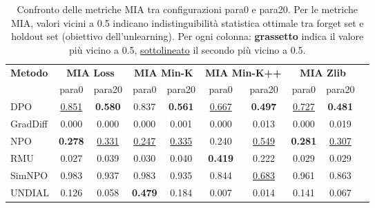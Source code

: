 \begin{table}[H]
\centering
\small
\begin{tabular}{lccccccccc}
\toprule
\textbf{Metodo} & \multicolumn{2}{c}{\textbf{MIA Loss}} & \multicolumn{2}{c}{\textbf{MIA Min-K} } & \multicolumn{2}{c}{\textbf{MIA Min-K++} } & \multicolumn{2}{c}{\textbf{MIA Zlib} } \\
\cmidrule(lr){2-3} \cmidrule(lr){4-5} \cmidrule(lr){6-7} \cmidrule(lr){8-9}
                & para0 & para20 & para0 & para20 & para0 & para20 & para0 & para20 \\
\midrule
DPO      & \underline{0.851} & \textbf{0.580} & 0.837 & \textbf{0.561} & \underline{0.667} & \textbf{0.497} & \underline{0.727} & \textbf{0.481} \\
GradDiff & 0.000 & 0.000 & 0.000 & 0.001 & 0.000 & 0.013 & 0.000 & 0.019 \\
NPO      & \textbf{0.278} & \underline{0.331} & \underline{0.247} & \underline{0.335} & 0.240 & \underline{0.549} & \textbf{0.281} & \underline{0.307} \\
RMU      & 0.027 & 0.039 & 0.030 & 0.040 & \textbf{0.419} & 0.222 & 0.029 & 0.029 \\
SimNPO   & 0.983 & 0.937 & 0.983 & 0.935 & 0.844 & \underline{0.683} & 0.961 & 0.863 \\
UNDIAL   & 0.126 & 0.058 & \textbf{0.479} & 0.184 & 0.007 & 0.014 & 0.141 & 0.067 \\
\bottomrule
\end{tabular}
\caption{Confronto delle metriche MIA tra configurazioni para0 e para20. Per le metriche MIA, valori vicini a 0.5 indicano indistinguibilità statistica ottimale tra forget set e holdout set (obiettivo dell'unlearning). Per ogni colonna: \textbf{grassetto} indica il valore più vicino a 0.5, \underline{sottolineato} il secondo più vicino a 0.5.}
\label{tab:mia_all_variants}
\end{table}


